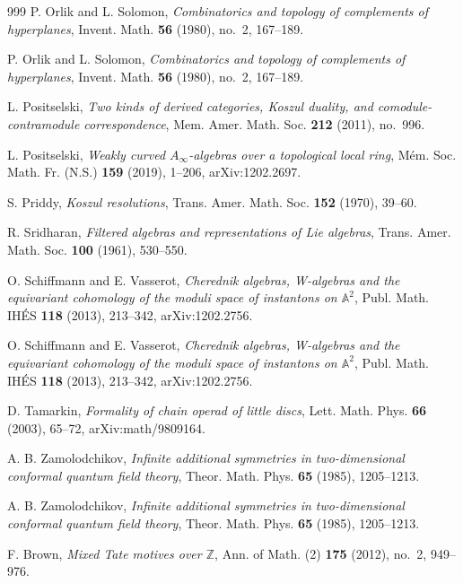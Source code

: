 \begin{thebibliography}{999}
P. Orlik and L. Solomon, \emph{Combinatorics and topology of complements of hyperplanes}, Invent. Math. \textbf{56} (1980), no.~2, 167--189.

P. Orlik and L. Solomon, \emph{Combinatorics and topology of complements of hyperplanes}, Invent. Math. \textbf{56} (1980), no.~2, 167--189.

L. Positselski, \emph{Two kinds of derived categories, Koszul duality, and comodule-contramodule correspondence}, Mem. Amer. Math. Soc. \textbf{212} (2011), no.~996.

L. Positselski, \emph{Weakly curved $A_\infty$-algebras over a topological local ring}, M\'em. Soc. Math. Fr. (N.S.) \textbf{159} (2019), 1--206, arXiv:1202.2697.

S. Priddy, \emph{Koszul resolutions}, Trans. Amer. Math. Soc. \textbf{152} (1970), 39--60.

R. Sridharan, \emph{Filtered algebras and representations of Lie algebras}, Trans. Amer. Math. Soc. \textbf{100} (1961), 530--550.

O. Schiffmann and E. Vasserot, \emph{Cherednik algebras, W-algebras and the equivariant cohomology of the moduli space of instantons on $\mathbb{A}^2$}, Publ. Math. IH\'ES \textbf{118} (2013), 213--342, arXiv:1202.2756.

O. Schiffmann and E. Vasserot, \emph{Cherednik algebras, W-algebras and the equivariant cohomology of the moduli space of instantons on $\mathbb{A}^2$}, Publ. Math. IH\'ES \textbf{118} (2013), 213--342, arXiv:1202.2756.

D. Tamarkin, \emph{Formality of chain operad of little discs}, Lett. Math. Phys. \textbf{66} (2003), 65--72, arXiv:math/9809164.

A. B. Zamolodchikov, \emph{Infinite additional symmetries in two-dimensional conformal quantum field theory}, Theor. Math. Phys. \textbf{65} (1985), 1205--1213.

A. B. Zamolodchikov, \emph{Infinite additional symmetries in two-dimensional conformal quantum field theory}, Theor. Math. Phys. \textbf{65} (1985), 1205--1213.


F. Brown, \emph{Mixed Tate motives over $\mathbb{Z}$}, Ann. of Math. (2) \textbf{175} (2012), no.~2, 949--976.


\end{thebibliography}
